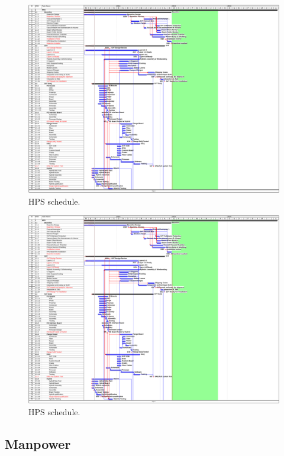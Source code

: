 \begin{figure}[H]
\centering
\includegraphics[page=1,angle=90,width=\textwidth]{cost_schedule/ScheduleHPSV470.pdf} 
\caption{HPS schedule.}
\label{fig:schedulea}
\end{figure}

\begin{figure}[H]
\centering
\includegraphics[page=2,angle=90,width=\textwidth]{cost_schedule/ScheduleHPSV470.pdf} 
\caption{HPS schedule.}
\label{fig:scheduleb}
\end{figure}

\subsection{Manpower}


